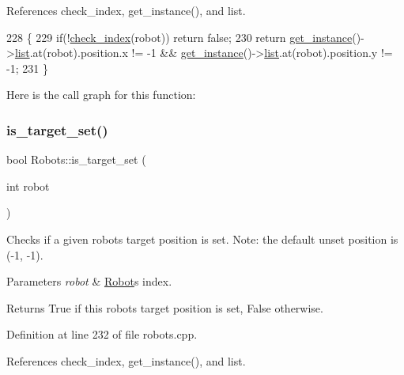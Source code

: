 References check\+\_\+index, get\+\_\+instance(), and list.


\begin{DoxyCode}
228                                        \{
229     \textcolor{keywordflow}{if}(!\hyperlink{robots_8hpp_ae3e6ae8f87cdc750c0b99bc609d9ae43}{check\_index}(robot)) \textcolor{keywordflow}{return} \textcolor{keyword}{false};
230     \textcolor{keywordflow}{return} \hyperlink{class_robots_a589bce74db5f34af384952d48435168f}{get\_instance}()->\hyperlink{class_robots_a2c6b77265028f82a4342ca1ef15ed305}{list}.at(robot).position.x != -1 && 
      \hyperlink{class_robots_a589bce74db5f34af384952d48435168f}{get\_instance}()->\hyperlink{class_robots_a2c6b77265028f82a4342ca1ef15ed305}{list}.at(robot).position.y != -1;
231 \}
\end{DoxyCode}
Here is the call graph for this function\+:
\mbox{\label{class_robots_ad79a530bb3c696a351f11f5698fb4960}} 
\subsubsection{\texorpdfstring{is\+\_\+target\+\_\+set()}{is\_target\_set()}}
{\footnotesize\ttfamily bool Robots\+::is\+\_\+target\+\_\+set (\begin{DoxyParamCaption}\item[{int}]{robot }\end{DoxyParamCaption})\hspace{0.3cm}{\ttfamily [static]}}

Checks if a given robot\textquotesingle{}s target position is set. Note\+: the default unset position is (-\/1, -\/1). 
\begin{DoxyParams}{Parameters}
{\em robot} & \hyperlink{struct_robots_1_1_robot}{Robot}\textquotesingle{}s index. \\
\hline
\end{DoxyParams}
\begin{DoxyReturn}{Returns}
True if this robot\textquotesingle{}s target position is set, False otherwise. 
\end{DoxyReturn}


Definition at line 232 of file robots.\+cpp.



References check\+\_\+index, get\+\_\+instance(), and list.



